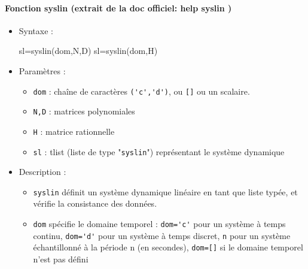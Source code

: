 \begin{doc}
\paragraph{Fonction syslin (extrait de la doc officiel: help syslin )}
    \begin{itemize}
        \item Syntaxe :
        \begin{Scilabcode}
sl=syslin(dom,N,D)
sl=syslin(dom,H)
        \end{Scilabcode}
        \item Paramètres :
            \begin{itemize}
                \item \verb?dom? : chaîne de caractères \verb?('c','d')?, 
                      ou \verb?[]? ou un scalaire.
                \item \verb?N,D? : matrices polynomiales
                \item \verb?H?   : matrice rationnelle
                \item \verb?sl?  : tlist (liste de type "\verb?syslin?") 
                      représentant le système dynamique
            \end{itemize}
        \item Description : 
            \begin{itemize}
                \item \verb?syslin? définit un système dynamique linéaire en 
                      tant que liste typée, et vérifie la consistance des 
                      données.
                \item \verb?dom? spécifie le domaine temporel :
                      \verb?dom='c'? pour un système à temps continu, 
                      \verb?dom='d'? pour un système à temps discret, 
                      \verb?n? pour un système échantillonné à la période n 
                      (en secondes), 
                      \verb?dom=[]? si le domaine temporel n'est pas défini
            \end{itemize}
    \end{itemize}
\end{doc}
